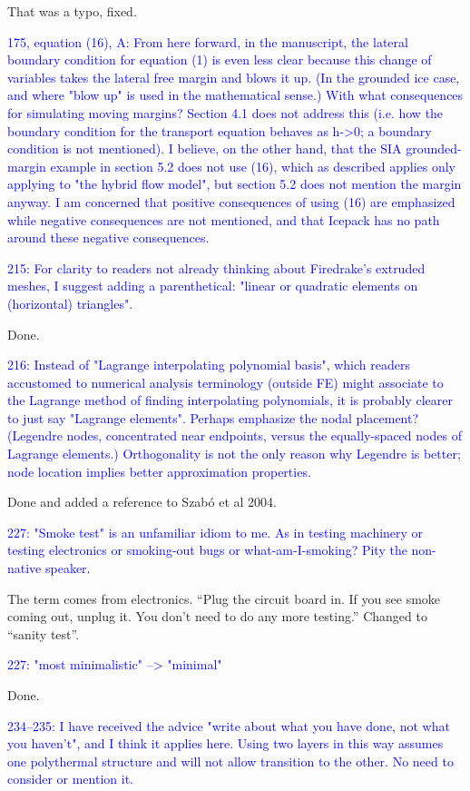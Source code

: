 \documentclass{article}
\theoremstyle{definition}
\theoremstyle{plain}
\begin{document}
That was a typo, fixed.

\textcolor{blue}{175, equation (16), A:  From here forward, in the manuscript, the lateral boundary condition for equation (1) is even less clear because this change of variables takes the lateral free margin and blows it up.  (In the grounded ice case, and where "blow up" is used in the mathematical sense.)  With what consequences for simulating moving margins?  Section 4.1 does not address this (i.e. how the boundary condition for the transport equation behaves as h->0; a boundary condition is not mentioned).  I believe, on the other hand, that the SIA grounded-margin example in section 5.2 does not use (16), which as described applies only applying to "the hybrid flow model", but section 5.2 does not mention the margin anyway.  I am concerned that positive consequences of using (16) are emphasized while negative consequences are not mentioned, and that Icepack has no path around these negative consequences.}

\textcolor{blue}{215:  For clarity to readers not already thinking about Firedrake's extruded meshes, I suggest adding a parenthetical: "linear or quadratic elements on (horizontal) triangles".}

Done.

\textcolor{blue}{216:  Instead of "Lagrange interpolating polynomial basis", which readers accustomed to numerical analysis terminology (outside FE) might associate to the Lagrange method of finding interpolating polynomials, it is probably clearer to just say "Lagrange elements".  Perhaps emphasize the nodal placement?  (Legendre nodes, concentrated near endpoints, versus the equally-spaced nodes of Lagrange elements.)  Orthogonality is not the only reason why Legendre is better; node location implies better approximation properties.}

Done and added a reference to Szab\'o et al 2004.

\textcolor{blue}{227:  "Smoke test" is an unfamiliar idiom to me.  As in testing machinery or testing electronics or smoking-out bugs or what-am-I-smoking?  Pity the non-native speaker.}

The term comes from electronics.
``Plug the circuit board in.
If you see smoke coming out, unplug it.
You don't need to do any more testing.''
Changed to ``sanity test''.

\textcolor{blue}{227:  "most minimalistic" --> "minimal"}

Done.

\textcolor{blue}{234--235:  I have received the advice "write about what you have done, not what you haven't", and I think it applies here.  Using two layers in this way assumes one polythermal structure and will not allow transition to the other.  No need to consider or mention it.}
\end{document}
